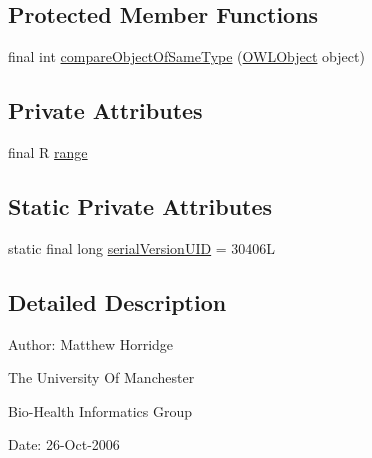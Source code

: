 \subsection*{Protected Member Functions}
\begin{DoxyCompactItemize}
\item 
final int \hyperlink{classuk_1_1ac_1_1manchester_1_1cs_1_1owl_1_1owlapi_1_1_o_w_l_property_range_axiom_impl_3_01_p_0140de1eb4f83293eb8b942ec8e6d67c5c_ac62038ecda55e0ca85a8dfbdade061ee}{compare\-Object\-Of\-Same\-Type} (\hyperlink{interfaceorg_1_1semanticweb_1_1owlapi_1_1model_1_1_o_w_l_object}{O\-W\-L\-Object} object)
\end{DoxyCompactItemize}
\subsection*{Private Attributes}
\begin{DoxyCompactItemize}
\item 
final R \hyperlink{classuk_1_1ac_1_1manchester_1_1cs_1_1owl_1_1owlapi_1_1_o_w_l_property_range_axiom_impl_3_01_p_0140de1eb4f83293eb8b942ec8e6d67c5c_a67dee8ca024cbf353808a6ae52b7d7f8}{range}
\end{DoxyCompactItemize}
\subsection*{Static Private Attributes}
\begin{DoxyCompactItemize}
\item 
static final long \hyperlink{classuk_1_1ac_1_1manchester_1_1cs_1_1owl_1_1owlapi_1_1_o_w_l_property_range_axiom_impl_3_01_p_0140de1eb4f83293eb8b942ec8e6d67c5c_a5e5d880619ff8cb39794f86153c3d4e4}{serial\-Version\-U\-I\-D} = 30406\-L
\end{DoxyCompactItemize}


\subsection{Detailed Description}
Author\-: Matthew Horridge\par
 The University Of Manchester\par
 Bio-\/\-Health Informatics Group\par
 Date\-: 26-\/\-Oct-\/2006\par
\par
 

